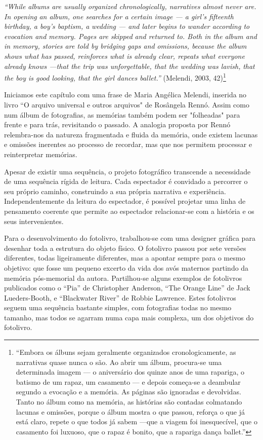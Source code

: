 \documentclass{article}
\begin{document}
\textit{“While albums are usually organized chronologically, narratives almost never are. In opening }
\textit{an album, one searches for a certain image — a girl's fifteenth birthday, a boy's baptism, a }
\textit{wedding — and later begins to wander according to evocation and memory. Pages are skipped }
\textit{and returned to. Both in the album and in memory, stories are told by bridging gaps and }
\textit{omissions, because the album shows what has passed, reinforces what is already clear, repeats }
\textit{what everyone already knows —that the trip was unforgettable, that the wedding was lavish, }
\textit{that the boy is good looking, that the girl dances ballet.”} (Melendi, 2003, 42)\footnote{“Embora os álbuns sejam geralmente organizados cronologicamente, as narrativas quase nunca o são. Ao abrir um álbum, procura-se uma determinada imagem — o aniversário dos quinze anos de uma rapariga, o batismo de um rapaz, um casamento — e depois começa-se a deambular segundo a evocação e a memória. As páginas são ignoradas e devolvidas. Tanto no álbum como na memória, as histórias são contadas colmatando lacunas e omissões, porque o álbum mostra o que passou, reforça o que já está claro, repete o que todos já sabem —que a viagem foi inesquecível, que o casamento foi luxuoso, que o rapaz é bonito, que a rapariga dança ballet.” } 
  
Iniciamos este capítulo com uma frase de Maria Angélica Melendi, inserida no 
livro  “O  arquivo  universal  e  outros  arquivos"  de  Rosângela  Rennó.  Assim  como  num 
álbum de fotografias, as memórias também podem ser "folheadas" para frente e para trás, 
revisitando  o  passado.  A  analogia  proposta  por  Rennó  relembra-nos  da  natureza 
fragmentada e fluida da memória, onde existem lacunas e omissões inerentes ao processo 
de recordar, mas que nos permitem processar e reinterpretar memórias.  
 
Apesar de existir uma sequência, o projeto fotográfico transcende a necessidade 
de uma sequência rígida de leitura. Cada espectador é convidado a percorrer o seu próprio 
caminho, construindo a sua própria narrativa e experiência. Independentemente da leitura 
do  espectador,  é  possível  projetar  uma  linha  de  pensamento  coerente  que  permite  ao 
espectador relacionar-se com a história e os seus intervenientes. 
 
 
 
 

 



Para o desenvolvimento do fotolivro, trabalhou-se com uma designer gráfica para 
desenhar toda a estrutura do objeto físico. O fotolivro passou por sete versões diferentes, 
todas ligeiramente diferentes, mas a apontar sempre para o mesmo objetivo: que fosse um 
pequeno excerto da vida dos avós maternos partindo da memória pós-memorial da autora. 
Partilhou-se  alguns  exemplos  de  fotolivros  publicados  como  o  “Pia”  de  Christopher 
Anderson, “The Orange Line” de Jack Lueders-Booth, e “Blackwater River” de Robbie 
Lawrence.  Estes  fotolivros  seguem  uma  sequência  bastante  simples,  com  fotografias 
todas  no  mesmo  tamanho,  mas  todos  se  agarram  numa  capa  mais  complexa,  um  dos 
objetivos do fotolivro. 
  
\end{document}
